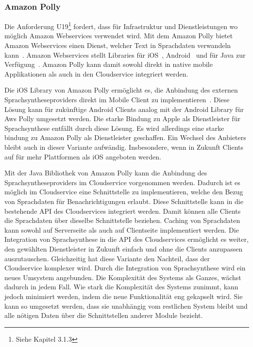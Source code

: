 \subsubsection{Amazon Polly}

Die Anforderung U19\footnote{Siehe Kapitel 3.1.3} fordert, dass für Infrastruktur und Dienstleistungen wo möglich Amazon Webservices verwendet wird.
Mit dem Amazon Polly bietet Amazon Webservices einen Dienst, welcher Text in Sprachdaten verwandeln kann~\cite{aws_polly}.
Amazon Webservices stellt Libraries für iOS~\cite{aws_polly_ios}, Android~\cite{aws_polly_sdks} und für Java zur Verfügung~\cite{aws_polly_java}.
Amazon Polly kann damit sowohl direkt in native mobile Applikationen als auch in den Cloudservice integriert werden.

Die iOS Library von Amazon Polly ermöglicht es, die Anbindung des externen Sprachsyntheseproviders direkt im Mobile Client zu implementieren~\cite{aws_polly_ios}.
Diese Lösung kann für zukünftige Android Clients analog mit der Android Library für Aws Polly umgesetzt werden.
Die starke Bindung zu Apple als Dienstleister für Sprachsynthese entfällt durch diese Lösung.
Es wird allerdings eine starke bindung zu Amazon Polly als Dienstleister geschaffen.
Ein Wechsel des Anbieters bleibt auch in dieser Variante aufwändig.
Insbesondere, wenn in Zukunft Clients auf für mehr Plattformen als iOS angeboten werden.

Mit der Java Bibliothek von Amazon Polly kann die Anbindung des Sprachsyntheseproviders im Cloudservice vorgenommen werden.
Dadurch ist es möglich im Cloudservice eine Schnittstelle zu implementieren, welche den Bezug von Sprachdaten für Benachrichtigungen erlaubt.
Diese Schnittstelle kann in die bestehende API des Cloudservices integriert werden.
Damit können alle Clients die Sprachdaten über dieselbe Schnittstelle beziehen.
Caching von Sprachdaten kann sowohl auf Serverseite als auch auf Clientseite implementiert werden.
Die Integration von Sprachsynthese in die API des Cloudservices ermöglicht es weiter, den gewählten Dienstleister in Zukunft einfach und ohne die Clients anzupassen auszutauschen.
Gleichzeitig hat diese Variante den Nachteil, dass der Cloudservice komplexer wird.
Durch die Integration von Sprachsynthese wird ein neues Umsystem angebunden.
Die Komplexität des Systems als Ganzes, wächst dadurch in jedem Fall.
Wie stark die Komplexität des Systems zunimmt, kann jedoch minimiert werden, indem die neue Funktionalität eng gekapselt wird.
Sie kann so umgesetzt werden, dass sie unabhängig vom restlichen System bleibt und alle nötigen Daten über die Schnittstellen anderer Module bezieht.

